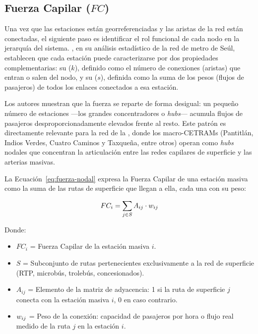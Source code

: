 
\subsection{Fuerza Capilar \texorpdfstring{($FC$)}{(FC)}}
\label{subsec:alimentacion-capilar}

Una vez que las estaciones están georreferenciadas y las aristas de la red están
conectadas, el siguiente paso es identificar el rol funcional de cada nodo en la
jerarquía del sistema. \citet{lee2008}, en su análisis estadístico de la red de
metro de Seúl, establecen que cada estación puede caracterizarse por dos
propiedades complementarias: su  ($k$), definido como el número
de conexiones (aristas) que entran o salen del nodo, y su 
($s$), definida como la suma de los pesos (flujos de pasajeros) de todos los
enlaces conectados a esa estación.

Los autores muestran que la fuerza se reparte de forma desigual: un pequeño
número de estaciones ---los grandes concentradores o \textit{hubs}--- acumula
flujos de pasajeros desproporcionadamente elevados frente al resto. Este patrón
es directamente relevante para la red de la \cdmx{}, donde los macro-CETRAMs
(Pantitlán, Indios Verdes, Cuatro Caminos y Taxqueña, entre otros) operan como \textit{hubs}
nodales que concentran la articulación entre las redes capilares de superficie y
las arterias masivas.

La Ecuación~\eqref{eq:fuerza-nodal} expresa la Fuerza Capilar de una estación
masiva como la suma de las rutas de superficie que llegan a ella, cada una con
su peso:

\begin{equation}
    FC_i = \sum_{j \in S} A_{ij} \cdot w_{ij}
    \label{eq:fuerza-nodal}
\end{equation}

Donde:
\begin{itemize}
    \item $FC_i$ = Fuerza Capilar de la estación
    masiva $i$.
    \item $S$ = Subconjunto de rutas pertenecientes exclusivamente a la red de
    superficie (RTP, microbús, trolebús, concesionados).
\item $A_{ij}$ = Elemento de la matriz de adyacencia: 1 si la ruta de superficie
    $j$ conecta con la estación masiva $i$, 0 en caso contrario.
\item $w_{ij}$ = Peso de la conexión: capacidad de pasajeros por hora o
flujo
    real medido de la ruta $j$ en la estación $i$.
\end{itemize}


